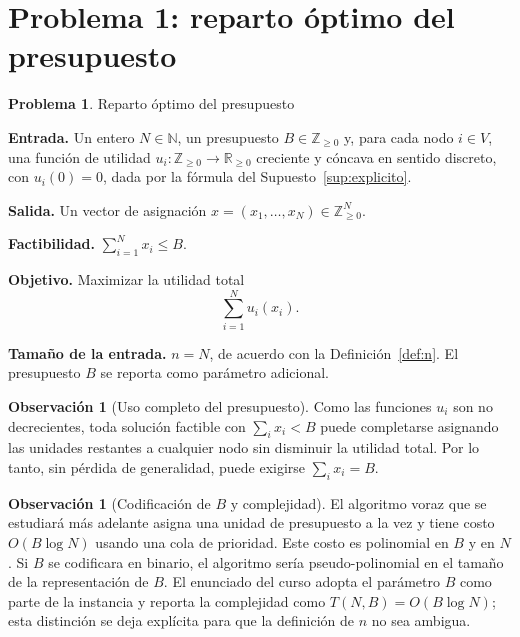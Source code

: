 \documentclass[11pt,a4paper]{article}
\theoremstyle{definition}
\newtheorem{problema}[definicion]{Problema}
\newtheorem{observacion}[definicion]{Observación}
\theoremstyle{plain}
\newcommand{\N}{\mathbb{N}}
\newcommand{\Z}{\mathbb{Z}}
\newcommand{\R}{\mathbb{R}}
\begin{document}
\section{Problema 1: reparto óptimo del presupuesto}

\begin{problema}\label{prob:reparto} Reparto óptimo del presupuesto

\textbf{Entrada.} Un entero $N\in\N$, un presupuesto $B\in\Z_{\ge0}$ y, para
cada nodo $i\in V$, una función de utilidad $u_i:\Z_{\ge0}\to\R_{\ge0}$
creciente y cóncava en sentido discreto, con $u_i(0)=0$, dada por la fórmula
del Supuesto~\ref{sup:explicito}.

\textbf{Salida.} Un vector de asignación
$x=(x_1,\dots,x_N)\in\Z_{\ge0}^N$.

\textbf{Factibilidad.} $\sum_{i=1}^{N} x_i\le B$.

\textbf{Objetivo.} Maximizar la utilidad total
\[
  \sum_{i=1}^{N} u_i(x_i).
\]

\textbf{Tamaño de la entrada.} $n=N$, de acuerdo con la
Definición~\ref{def:n}. El presupuesto $B$ se reporta como parámetro adicional.
\end{problema}

\begin{observacion}[Uso completo del presupuesto]
Como las funciones $u_i$ son no decrecientes, toda solución factible con
$\sum_i x_i<B$ puede completarse asignando las unidades restantes a cualquier
nodo sin disminuir la utilidad total. Por lo tanto, sin pérdida de
generalidad, puede exigirse $\sum_i x_i=B$.
\end{observacion}

\begin{observacion}[Codificación de $B$ y complejidad]
El algoritmo voraz que se estudiará más adelante asigna una unidad de
presupuesto a la vez y tiene costo $O(B\log N)$ usando una cola de prioridad.
Este costo es polinomial en $B$ y en $N$. Si $B$ se codificara en binario, el
algoritmo sería pseudo-polinomial en el tamaño de la representación de $B$. El
enunciado del curso adopta el parámetro $B$ como parte de la instancia y
reporta la complejidad como $T(N,B)=O(B\log N)$; esta distinción se deja
explícita para que la definición de $n$ no sea ambigua.
\end{observacion}

\end{document}
